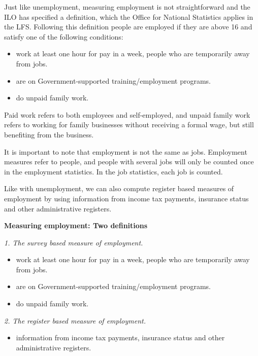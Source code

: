 \documentclass[
]{book}
\providecommand{\tightlist}{%
  \setlength{\itemsep}{0pt}\setlength{\parskip}{0pt}}
\begin{document}
Just like unemployment, measuring employment is not straightforward and the ILO has specified a definition, which the Office for National Statistics applies in the LFS. Following this definition people are employed if they are above 16 and satisfy one of the following conditions:

\begin{itemize}
\tightlist
\item
  work at least one hour for pay in a week, people who are temporarily away from jobs.
\item
  are on Government-supported training/employment programs.
\item
  do unpaid family work.
\end{itemize}

Paid work refers to both employees and self-employed, and unpaid family work refers to working for family businesses without receiving a formal wage, but still benefiting from the business.

It is important to note that employment is not the same as jobs. Employment measures refer to people, and people with several jobs will only be counted once in the employment statistics. In the job statistics, each job is counted.

Like with unemployment, we can also compute register based measures of employment by using information from income tax payments, insurance status and other administrative registers.

\begin{myblock}
\textbf{Measuring employment: Two definitions}

\emph{1. The survey based measure of employment.}

\begin{itemize}
\tightlist
\item
  work at least one hour for pay in a week, people who are temporarily
  away from jobs.
\item
  are on Government-supported training/employment programs.
\item
  do unpaid family work.
\end{itemize}

\emph{2. The register based measure of employment.}

\begin{itemize}
\tightlist
\item
  information from income tax payments, insurance status and other
  administrative registers.
\end{itemize}
\end{myblock}
\end{document}
